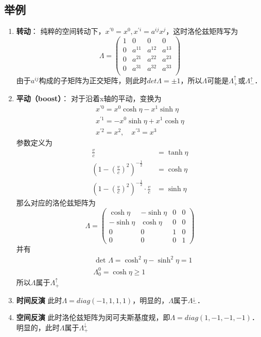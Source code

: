 \subsection{举例}
\begin{enumerate}
\item \textbf{转动}： 纯粹的空间转动下，$x^{\prime 0}=x^{0}, x^{\prime i}=a^{i j} x^{j}$，这时洛伦兹矩阵写为
\begin{equation}       %
\Lambda=\left(                 %
  \begin{array}{cccc}   %
   1& 0 & 0 & 0\\  %
   0& a^{11} &  a^{12} &  a^{13}\\  %
   0& a^{21} &  a^{22} &  a^{23}\\  %
   0& a^{31} &  a^{32} &  a^{33}\\  %
  \end{array}
\right)                 %
\end{equation}
由于$a^{ij}$构成的子矩阵为正交矩阵，则此时$det\Lambda=\pm1$，所以$\Lambda$可能是$\Lambda_{+}^{\uparrow}$或$\Lambda_{-}^{\uparrow}$．
\item \textbf{平动（boost）}： 对于沿着x轴的平动，变换为
\begin{equation}\begin{array}{c}
x^{\prime 0}=x^{0} \cosh \eta-x^{1} \sinh \eta \\
x^{\prime 1}=-x^{0} \sinh \eta+x^{1} \cosh \eta \\
x^{\prime 2}=x^{2}, \quad x^{\prime 3}=x^{3}
\end{array}\end{equation}
参数定义为
\begin{align}
 \frac{v}{c} &=\tanh\eta \\
\left(1-(\frac{v}{c})^2 \right)^{-\frac{1}{2}} &=\cosh\eta\\
\left   (1-(\frac{v}{c})^2 \right)^{-\frac{1}{2}}\cdot\frac{v}{c}&=\sinh\eta 
\end{align}
那么对应的洛伦兹矩阵为
\begin{equation}\Lambda=\left(\begin{array}{cccc}
\cosh \eta & -\sinh \eta & 0 & 0 \\
-\sinh \eta & \cosh \eta & 0 & 0 \\
0 & 0 & 1 & 0 \\
0 & 0 & 0 & 1
\end{array}\right)\end{equation}
并有
\begin{equation}\begin{aligned}
&\text { det } \Lambda=\cosh ^{2} \eta-\sinh ^{2} \eta=1\\
&\Lambda_{0}^{0}=\cosh \eta \geqslant 1
\end{aligned}\end{equation}
所以$\Lambda$属于$\Lambda_{+}^{\uparrow}$
\item \textbf{时间反演}
此时$\Lambda=diag(-1,1,1,1)$，明显的，$\Lambda$属于$\Lambda_{-}^{\downarrow}$．
\item \textbf{空间反演}
此时洛伦兹矩阵为闵可夫斯基度规，即$\Lambda=diag(1,-1,-1,-1)$．明显的，此时$\Lambda$属于$\Lambda_{+}^{\downarrow}$
\end{enumerate}

